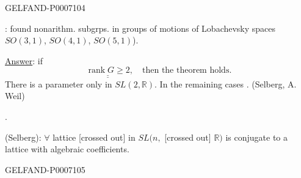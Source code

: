 \begin{GelfandAdjacentEvidence}{GELFAND-P000710}{4}


: found nonarithm. subgrps. in groups of motions of Lobachevsky spaces
\(SO(3,1)\), \(SO(4,1)\), \(SO(5,1)\)).

\underline{Answer}: if
\[
\underline{\underline{\operatorname{rank}G\ge 2}},\quad\text{then the theorem holds.}
\]
There is a parameter only in \(SL(2,\mathbb R)\).
In the remaining cases . (Selberg, A. Weil)

.

 (Selberg): \(\forall\) lattice
[crossed out] in \(SL(n,\) [crossed out] \(\mathbb R)\) is conjugate to a lattice with algebraic coefficients.
\end{GelfandAdjacentEvidence}
\begin{GelfandAdjacentEvidence}{GELFAND-P000710}{5}

\end{GelfandAdjacentEvidence}



